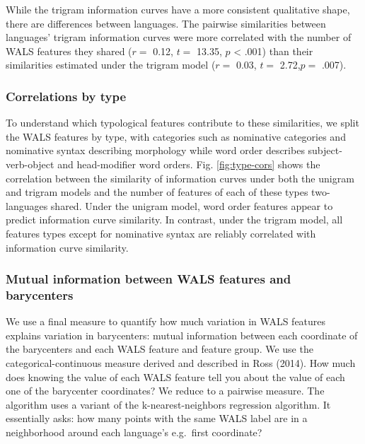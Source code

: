 \documentclass[man,floatsintext]{apa6}
\begin{document}
While the trigram information curves have a more consistent qualitative shape, there are differences between languages. The pairwise similarities between languages' trigram information curves were more correlated with the number of WALS features they shared (\(r =\) 0.12, \(t =\) 13.35, \(p\) \textless{} .001) than their similarities estimated under the trigram model (\(r =\) 0.03, \(t =\) 2.72,\(p =\) .007).

\hypertarget{correlations-by-type}{%
\subsubsection{Correlations by type}\label{correlations-by-type}}

To understand which typological features contribute to these similarities, we split the WALS features by type, with categories such as nominative categories and nominative syntax describing morphology while word order describes subject-verb-object and head-modifier word orders. Fig. \ref{fig:type-cors} shows the correlation between the similarity of information curves under both the unigram and trigram models and the number of features of each of these types two-languages shared. Under the unigram model, word order features appear to predict information curve similarity. In contrast, under the trigram model, all features types except for nominative syntax are reliably correlated with information curve similarity.

\hypertarget{mutual-information-between-wals-features-and-barycenters}{%
\subsubsection{Mutual information between WALS features and barycenters}\label{mutual-information-between-wals-features-and-barycenters}}

We use a final measure to quantify how much variation in WALS features explains variation in barycenters: mutual information between each coordinate of the barycenters and each WALS feature and feature group. We use the categorical-continuous measure derived and described in Ross (2014). How much does knowing the value of each WALS feature tell you about the value of each one of the barycenter coordinates? We reduce to a pairwise measure. The algorithm uses a variant of the k-nearest-neighbors regression algorithm. It essentially asks: how many points with the same WALS label are in a neighborhood around each language's e.g.~first coordinate?
\end{document}
